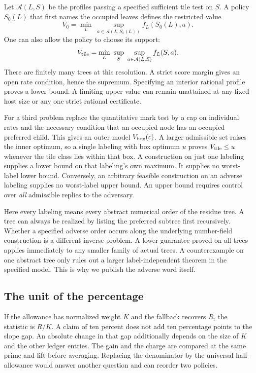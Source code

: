 \documentclass[12pt,letterpaper]{article}
\begin{document}
Let \(\mathcal A(L,S)\) be the profiles passing a specified sufficient tile test on \(S\). A policy \(S_0(L)\) that first names the occupied leaves defines the restricted value
\[
 V_0=\min_L\ \sup_{a\in\mathcal A(L,S_0(L))} f_L(S_0(L),a).
\]
One can also allow the policy to choose its support:
\[
 V_{\rm tile}=\min_L\ \sup_{S}\ \sup_{a\in\mathcal A(L,S)} f_L(S,a).
\]
There are finitely many trees at this resolution. A strict score margin gives an open rate condition, hence the supremum. Specifying an interior rational profile proves a lower bound. A limiting upper value can remain unattained at any fixed host size or any one strict rational certificate.

For a third problem replace the quantitative mark test by a cap on individual rates and the necessary condition that an occupied node has an occupied preferred child. This gives an outer model \(V_{\rm box}(c)\). A larger admissible set raises the inner optimum, so a single labeling with box optimum \(u\) proves \(V_{\rm tile}\le u\) whenever the tile class lies within that box. A construction on just one labeling supplies a lower bound on that labeling's own maximum. It supplies no worst-label lower bound. Conversely, an arbitrary feasible construction on an adverse labeling supplies no worst-label upper bound. An upper bound requires control over \emph{all} admissible replies to the adversary.

Here every labeling means every abstract numerical order of the residue tree. A tree can always be realized by listing the preferred subtree first recursively. Whether a specified adverse order occurs along the underlying number-field construction is a different inverse problem. A lower guarantee proved on all trees applies immediately to any smaller family of actual trees. A counterexample on one abstract tree only rules out a larger label-independent theorem in the specified model. This is why we publish the adverse word itself.

\subsection{The unit of the percentage}
If the allowance has normalized weight \(K\) and the fallback recovers \(R\), the statistic is \(R/K\). A claim of ten percent does not add ten percentage points to the slope gap. An absolute change in that gap additionally depends on the size of \(K\) and the other ledger entries. The gain and the charge are compared at the same prime and lift before averaging. Replacing the denominator by the universal half-allowance would answer another question and can reorder two policies.
\end{document}
